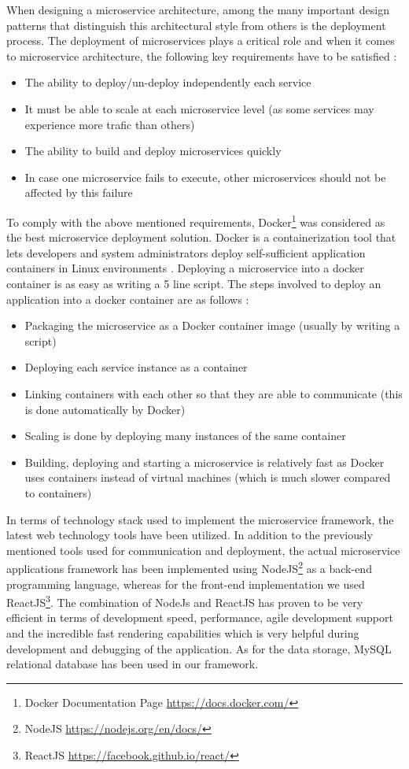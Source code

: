 When designing a microservice architecture, among the many important design patterns that distinguish this architectural style from others is the deployment process. The deployment of microservices plays a critical role and when it comes to microservice architecture, the following key requirements have to be satisfied \cite{dzone}:
\begin{itemize}
    \item The ability to deploy/un-deploy independently each service
    \item It must be able to scale at each microservice level (as some services may experience more trafic than others)
    \item The ability to build and deploy microservices quickly
    \item In case one microservice fails to execute, other microservices should not be affected by this failure
\end{itemize}

To comply with the above mentioned requirements, Docker\footnote{Docker Documentation Page \url{https://docs.docker.com/}} was considered as the best microservice deployment solution. Docker is a containerization tool that lets developers and system administrators deploy self-sufficient application containers in Linux environments \cite{dzone}. Deploying a microservice into a docker container is as easy as writing a 5 line script. The steps involved to deploy an application into a docker container are as follows \cite{dzone}: 
\begin{itemize}
    \item Packaging the microservice as a Docker container image (usually by writing a script)
    \item Deploying each service instance as a container
    \item Linking containers with each other so that they are able to communicate (this is done automatically by Docker)
    \item Scaling is done by deploying many instances of the same container
    \item Building, deploying and starting a microservice is relatively fast as Docker uses containers instead of virtual machines (which is much slower compared to containers)
\end{itemize}

In terms of technology stack used to implement the microservice framework, the latest web technology tools have been utilized. In addition to the previously mentioned tools used for communication and deployment, the actual microservice applications framework has been implemented using NodeJS\footnote{NodeJS \url{https://nodejs.org/en/docs/}} as a back-end programming language, whereas for the front-end implementation we used ReactJS\footnote{ReactJS \url{https://facebook.github.io/react/}}. The combination of NodeJs and ReactJS has proven to be very efficient in terms of development speed, performance, agile development support and the incredible fast rendering capabilities which is very helpful during development and debugging of the application. As for the data storage, MySQL relational database has been used in our framework. 

